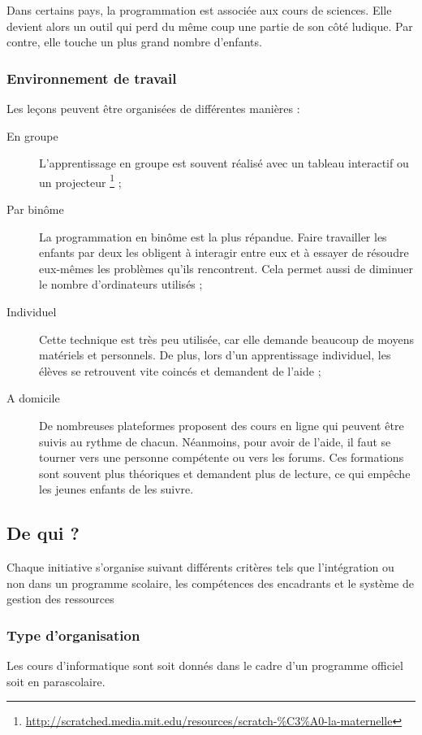 Dans certains pays, la programmation est associée aux cours de sciences. Elle devient alors un outil qui perd du même coup une partie de son côté ludique. Par contre, elle touche un plus grand nombre d'enfants.\\

\subsubsection{Environnement de travail}
\label{paire}
Les leçons peuvent être organisées de différentes manières :
\begin{description}
  \item[En groupe] L'apprentissage en groupe est souvent réalisé avec un tableau interactif ou un projecteur \footnote{\url{http://scratched.media.mit.edu/resources/scratch-\%C3\%A0-la-maternelle}} ;
  \item[Par binôme] La programmation en binôme est la plus répandue. Faire travailler les enfants par deux les obligent à interagir entre eux et à essayer de résoudre eux-mêmes les problèmes qu'ils rencontrent. Cela permet aussi de diminuer le nombre d'ordinateurs utilisés ;
  \item[Individuel] Cette technique est très peu utilisée, car elle demande beaucoup de moyens matériels et personnels. De plus, lors d'un apprentissage individuel, les élèves se retrouvent vite coincés et demandent de l'aide ;
  \item[A domicile] De nombreuses plateformes proposent des cours en ligne qui peuvent être suivis au rythme de chacun. Néanmoins, pour avoir de l'aide, il faut se tourner vers une personne compétente ou vers les forums. Ces formations sont souvent plus théoriques et demandent plus de lecture, ce qui empêche les jeunes enfants de les suivre.
\end{description}

\subsection{De qui ?}
Chaque initiative s'organise suivant différents critères tels que l'intégration ou non dans un programme scolaire, les compétences des encadrants et le système de gestion des ressources

\subsubsection{Type d'organisation}
Les cours d'informatique sont soit donnés dans le cadre d'un programme officiel soit en parascolaire.

